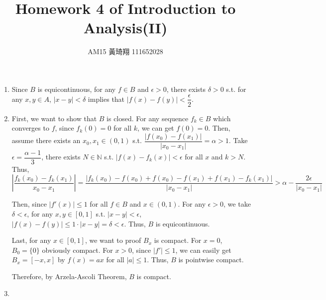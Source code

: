 \documentclass[12pt]{article}
\title{Homework 4 of Introduction to Analysis(II)}
\author{AM15 黃琦翔 111652028}
\begin{document}
\maketitle
\begin{enumerate}
    \item Since $B$ is equicontinuous, for any $f \in B$ and $\epsilon > 0$, 
    there exists $\delta > 0$ s.t.  for any $x, y\in A$, $|x - y| < \delta$ implies that $|f(x) - f(y)| < \dfrac{\epsilon}{2}$.

    \item First, we want to show that $B$ is closed.
    For any sequence $f_k \in B$ which converges to $f$, 
    since $f_k(0) = 0$ for all $k$, we can get $f(0) = 0$.
    Then, assume there exists an $x_0, x_1 \in (0, 1)$ s.t. $\dfrac{|f(x_0) - f(x_1)|}{|x_0 - x_1|} = \alpha > 1$.
    Take $\epsilon = \dfrac{\alpha-1}{3}$, there exists $N \in \mathbb{N}$ s.t. $|f(x) - f_k(x)| < \epsilon$ for all $x$ and $k > N$.
    Thus, $|\dfrac{f_k(x_0) - f_k(x_1)}{x_0 - x_1}| = \dfrac{|f_k(x_0) - f(x_0) + f(x_0) - f(x_1) + f(x_1) - f_k(x_1)|}{|x_0 - x_1|} > \alpha - \dfrac{2\epsilon}{|x_0 - x_1|}$
    
    Then, since $|f'(x)| \leq 1$ for all $f\in B$ and $x\in (0, 1)$.
    For any $\epsilon > 0$, we take $\delta < \epsilon$,
    for any $x, y \in [0, 1]$ s.t. $|x - y| < \epsilon$, 
    $|f(x) - f(y)| \leq 1 \cdot |x-y| = \delta < \epsilon$.
    Thus, $B$ is equicontinuous.

    Last, for any $x \in [0, 1]$, we want to proof $B_x$ is compact.
    For $x = 0$, $B_0 = \{ 0\}$ obviously compact.
    For $x > 0$, since $|f'|\leq 1$, we can easily get $B_x = [-x, x]$ by $f(x) = ax$ for all $|a| \leq 1$.
    Thus, $B$ is pointwise compact.

    Therefore, by Arzela-Ascoli Theorem, $B$ is compact.

    \item
\end{enumerate}
\end{document}
